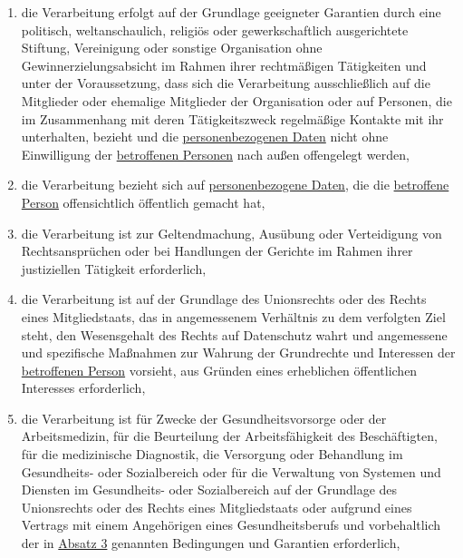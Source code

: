 \begin{enumerate}
\begin{enumerate}
    \item die Verarbeitung erfolgt auf der Grundlage geeigneter Garantien durch eine politisch, weltanschaulich,
     religiös oder gewerkschaftlich ausgerichtete Stiftung, Vereinigung oder sonstige Organisation ohne
     Gewinnerzielungsabsicht im Rahmen ihrer rechtmäßigen Tätigkeiten und unter der Voraussetzung, dass sich die
     Verarbeitung ausschließlich auf die Mitglieder oder ehemalige Mitglieder der Organisation oder auf Personen, die
     im Zusammenhang mit deren Tätigkeitszweck regelmäßige Kontakte mit ihr unterhalten, bezieht und die
     \hyperref[itm:04-1]{personenbezogenen Daten} nicht ohne Einwilligung der \hyperref[itm:04-1]{betroffenen Personen} nach außen offengelegt werden,
    \label{itm:09-2d}

    \item die Verarbeitung bezieht sich auf \hyperref[itm:04-1]{personenbezogene Daten}, die die \hyperref[itm:04-1]{betroffene Person} offensichtlich öffentlich
     gemacht hat,
    \label{itm:09-2e}

    \item die Verarbeitung ist zur Geltendmachung, Ausübung oder Verteidigung von Rechtsansprüchen oder bei Handlungen
     der Gerichte im Rahmen ihrer justiziellen Tätigkeit erforderlich,
    \label{itm:09-2f}

    \item die Verarbeitung ist auf der Grundlage des Unionsrechts oder des Rechts eines Mitgliedstaats, das in
     angemessenem Verhältnis zu dem verfolgten Ziel steht, den Wesensgehalt des Rechts auf Datenschutz wahrt und
     angemessene und spezifische Maßnahmen zur Wahrung der Grundrechte und Interessen der \hyperref[itm:04-1]{betroffenen Person} vorsieht,
     aus Gründen eines erheblichen öffentlichen Interesses erforderlich,
    \label{itm:09-2g}

    \item die Verarbeitung ist für Zwecke der Gesundheitsvorsorge oder der Arbeitsmedizin, für die Beurteilung der
     Arbeitsfähigkeit des Beschäftigten, für die medizinische Diagnostik, die Versorgung oder Behandlung im
     Gesundheits- oder Sozialbereich oder für die Verwaltung von Systemen und Diensten im Gesundheits- oder
     Sozialbereich auf der Grundlage des Unionsrechts oder des Rechts eines Mitgliedstaats oder aufgrund eines Vertrags
     mit einem Angehörigen eines Gesundheitsberufs und vorbehaltlich der in \hyperref[itm:09-3]{Absatz 3} genannten
     Bedingungen und Garantien erforderlich,
    \label{itm:09-2h}


\end{enumerate}
\end{enumerate}
